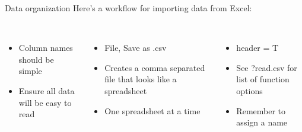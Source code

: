 \documentclass[xcolor=svgnames]{beamer}\usepackage[]{graphicx}\usepackage[]{color}
\begin{document}
\begin{frame}[fragile]{Data organization}
Here's a workflow for importing data from Excel:\\~\\
\begin{center}
\end{center}
\begin{columns}[t]
\begin{column}{0.33\textwidth}
\begin{itemize}
\item Column names should be simple
\item Ensure all data will be easy to read
\end{itemize}
\end{column}
\begin{column}{0.33\textwidth}
\begin{itemize}
\item File, Save as .csv
\item Creates a comma separated file that looks like a spreadsheet
\item One spreadsheet at a time
\end{itemize}
\end{column}
\begin{column}{0.33\textwidth}
\begin{itemize}
\item header = T
\item See ?read.csv for list of function options
\item Remember to assign a name
\end{itemize}
\end{column}
\end{columns}
\end{frame}
\end{document}
